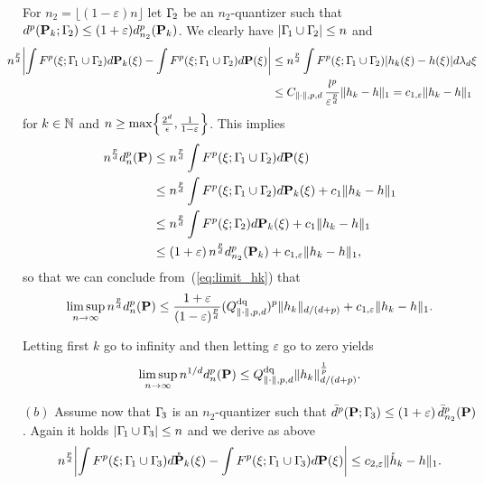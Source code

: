 For $n_2 = \lfloor(1-\varepsilon)n\rfloor$ let $\Gamma_{\!2}$ be an $n_2$-quantizer
such that $d^p(\mathbf{P}_k; \Gamma_{\!2}) \leq (1+\varepsilon) d^p_{n_2}(\mathbf{P}_k)$.
We clearly
have $\lvert\Gamma_{\!1} \cup \Gamma_{\!2}\rvert\leq n$ and
\begin{eqnarray*}
\begin{split}
 \hskip -0.5cm  n^{\frac pd} \biggabs{\int  F^p(\xi; \Gammaone \cup \Gammatwo) 
  d\Probb_k(\xi) - \int F^p(\xi; \Gammaone \cup \Gammatwo) d\Probb(\xi) } & \leq n^{\frac pd} \int F^p(\xi; \Gammaone \cup \Gammatwo) \abs{ h_k(\xi) - h(\xi) } d\lambda_d\xi\\ & \leq  C_{\norm{\cdot},p,d}\, \frac{l^p}{\varepsilon^{\frac pd}} \norm{h_k -
  h}_1= c_{1,\varepsilon} \norm{h_k -  h}_1 
\end{split}
\end{eqnarray*}
for $k\in\mathbb{N}$ and $n \geq \max\Bigl\{\frac{2^d}{\epsilon}, \frac{1}{1-\varepsilon}
\Bigr\}$. This implies
\begin{eqnarray*}
\begin{split}
  n^{\frac pd} d_n^p (\mathbf{P}) & \leq  n^{\frac pd} \int F^p(\xi; \Gamma_{\!1} \cup
  \Gamma_{\!2}) d\mathbf{P}(\xi)\\ 
  &  \leq n^{\frac pd} \int F^p(\xi; \Gamma_{\!1} \cup \Gamma_{\!2}) d\mathbf{P}_k(\xi) +
  c_1 \lVert h_k - h\rVert_1\\ 
  & \leq n^{\frac pd} \int F^p(\xi; \Gamma_{\!2}) d\mathbf{P}_k(\xi) + c_1 \lVert h_k -
  h\rVert_1\\ 
  & \leq (1+\varepsilon)\, n^{\frac pd} d_{n_2}^p(\mathbf{P}_k) + c_{1,\varepsilon}
  \lVert h_k - h\rVert_1,
\end{split}
\end{eqnarray*}
so that we can conclude from~(\ref{eq:limit_hk}) that
\[
\limsup_{n\to\infty} n^{\frac pd} d_{n}^p (\mathbf{P}) \leq
\frac{1+\varepsilon}{(1-\varepsilon)^{\frac pd}} (Q^{\text{dq}}_{\lVert\cdot\rVert, p, d})^p \lVert h_k\rVert_{d/(d+p)} +
c_{1,\varepsilon} \lVert h_k - h\rVert_1.
\]

Letting first $k$ go to infinity and then letting $\varepsilon$ go to zero yields
\[
\limsup_{n\to\infty} n^{1/d} d_n^p(\mathbf{P}) \leq Q^{\text{dq}}_{\lVert\cdot\rVert, p, d} \lVert h_k\rVert_{d/(d+p)}^{\frac 1p}.
\]

\noindent $(b)$ Assume now  that $\Gamma_{\!3}$ is an $n_2$-quantizer such that $\bar
d^p(\mathbf{P};\Gamma_{\!3}) \leq (1+\varepsilon) \,\bar d^p_{n_2}(\mathbf{P})$.
% 
% 
Again it holds $\lvert\Gamma_{\!1} \cup \Gamma_{\!3}\rvert \leq n$ and
we derive as above
\begin{equation}\label{eq:boundOpenhk}
  n^{\frac pd} \biggabs{\int  F^p(\xi; \Gammaone \cup \Gammathree) 
  d\mathring\Probb_k(\xi) - \int F^p(\xi; \Gammaone \cup \Gammathree)
  d\Probb(\xi) } \leq c_{2,\varepsilon} \norm{\mathring h_k - h}_1.
\end{equation}

